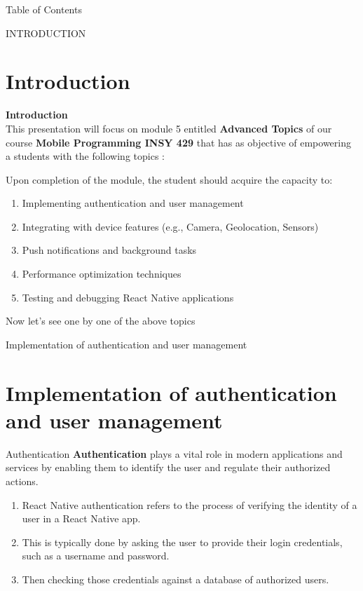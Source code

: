 \documentclass[10pt]{beamer}
\begin{document}
\begin{frame}{Table of Contents}
\tableofcontents
\end{frame}
\begin{frame}{INTRODUCTION}
\section{Introduction}
\textbf{Introduction}\\
This presentation will focus on module 5 entitled \textbf{Advanced Topics} of our course  \textbf{Mobile Programming INSY 429} that has as objective of empowering a students with the following   topics :
\begin{block}{Upon completion of the module, the student should acquire the capacity to:}
\begin{enumerate}
\item[\ding{242}] Implementing authentication and user management
\item[\ding{242}] Integrating with device features (e.g., Camera, Geolocation, Sensors) 
\item[\ding{242}] Push notifications and background tasks
\item[\ding{242}] Performance optimization techniques
\item[\ding{242}] Testing and debugging React Native applications

 
\end{enumerate}
\end{block}
Now let's see one by one of the above topics

\end{frame}

\begin{frame}{Implementation of authentication and user management}
\section{Implementation of authentication and user management}
\begin{block}{Authentication}
\textbf{Authentication} plays a vital role in modern applications and services by enabling them to identify the user and regulate their authorized actions.
\begin{enumerate}
\item[\ding{230}]React Native authentication refers to the process of verifying the identity of a user in a React Native app.
\item[\ding{230}]This is typically done by asking the user to provide their login credentials, such as a username and password.
\item[\ding{230}] Then checking those credentials against a database of authorized users.




\end{enumerate} 
\end{block}

\end{frame}
\end{document}
